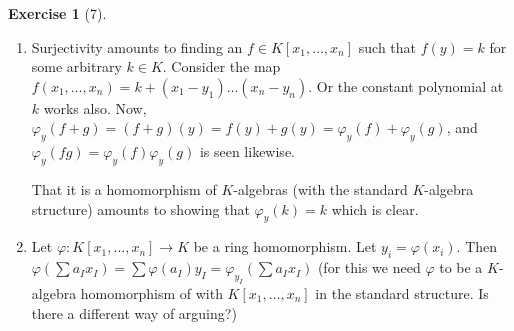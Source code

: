 \documentclass[reqno]{amsart}
\theoremstyle{definition}
\newtheorem{exercise}[theorem]{Exercise}
\theoremstyle{remark}
\begin{document}
\begin{exercise}[7]
    \begin{enumerate}
        \item Surjectivity amounts to finding an
            $f \in K \left[ x_1, \ldots, x_n \right] $ 
            such that $f(y) = k$ for some arbitrary $k \in K$.
            Consider the map
            $f(x_1,\ldots,x_n) =
            k + \left( x_1-y_1 \right) \ldots \left( x_n
            -y_n\right) $. Or the constant polynomial at $k$ works
            also. Now,
            $\varphi_y \left( f+g \right) 
            = \left( f+g \right) (y)
            = f(y) + g(y) = \varphi_y(f) + 
            \varphi_y(g)$, and
            $\varphi_y(fg) = \varphi_y(f)\varphi_y(g)$ is
            seen likewise. 

            That it is a homomorphism of
            $K$-algebras (with the
            standard $K$-algebra structure)
            amounts to showing that
            $\varphi_y\left( k  \right) 
            = k $ which is clear.
        \item Let $\varphi  \colon K \left[ x_1, \ldots, x_n
            \right]  \to K$ be a ring homomorphism. 
            Let $y_i = \varphi (x_i)$. Then
            $\varphi \left( \sum a_I x_I \right) 
            = \sum \varphi \left( a_I \right) 
             y_I = 
             \varphi_{y_I}\left( \sum a_I x_I \right) $
             (for this we need
             $\varphi $ to be a $K$-algebra
             homomorphism of with
              $K\left[ x_1, \ldots,x_n \right] $ 
              in the standard structure.
              Is there a different way of arguing?)
    \end{enumerate}
\end{exercise}








\end{document}
